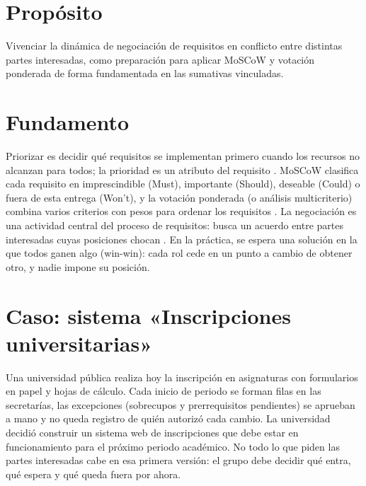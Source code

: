 \documentclass[11pt]{article}
\newcommand{\seccion}[1]{\section{\textcolor{utegreendk}{#1}}}
\begin{document}
\seccion{Propósito}

Vivenciar la dinámica de negociación de requisitos en conflicto entre distintas partes interesadas, como preparación para aplicar MoSCoW y votación ponderada de forma fundamentada en las sumativas vinculadas.

\seccion{Fundamento}

Priorizar es decidir qué requisitos se implementan primero cuando los recursos no alcanzan para todos; la prioridad es un atributo del requisito \citep{iso29148_2018}. MoSCoW clasifica cada requisito en imprescindible (Must), importante (Should), deseable (Could) o fuera de esta entrega (Won't), y la votación ponderada (o análisis multicriterio) combina varios criterios con pesos para ordenar los requisitos \citep{wiegers_beatty_2013,ireb_cpre_fl_2026}. La negociación es una actividad central del proceso de requisitos: busca un acuerdo entre partes interesadas cuyas posiciones chocan \citep{pohl_2025}. En la práctica, se espera una solución en la que todos ganen algo (win-win): cada rol cede en un punto a cambio de obtener otro, y nadie impone su posición.

\seccion{Caso: sistema «Inscripciones universitarias»}

Una universidad pública realiza hoy la inscripción en asignaturas con formularios en papel y hojas de cálculo. Cada inicio de periodo se forman filas en las secretarías, las excepciones (sobrecupos y prerrequisitos pendientes) se aprueban a mano y no queda registro de quién autorizó cada cambio. La universidad decidió construir un sistema web de inscripciones que debe estar en funcionamiento para el próximo periodo académico. No todo lo que piden las partes interesadas cabe en esa primera versión: el grupo debe decidir qué entra, qué espera y qué queda fuera por ahora.
\end{document}

